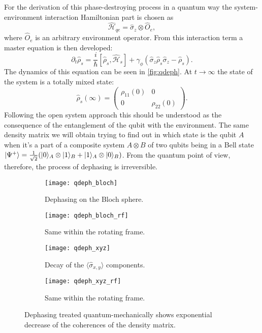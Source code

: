 \documentclass[12pt, twoside]{report}
\DeclarePairedDelimiter\ket{\lvert}{\rangle}
\newcommand{\rbrkt}[1]{\left( #1 \right)}
\numberwithin{equation}{section}
\begin{document}
For the derivation of this phase-destroying process in a quantum way the system-environment interaction Hamiltonian part is chosen as
\[
\mathcal{\hat H}_{qe} = \hat \sigma_z \otimes \hat O_e, 
\]
where $\hat O_e$ is an arbitrary environment operator. From this interaction term a master equation is then developed:
\[
\partial_t \hat \rho_s = \frac{i}{\hbar}[\hat \rho_s, \mathcal{\hat H}_s] + \gamma_\phi (\hat \sigma_z \hat \rho_s \hat \sigma_z - \hat \rho_s).
\]
The dynamics of this equation can be seen in \autoref{fig:qdeph}.  At $t \rightarrow \infty$ the state of the system is a totally mixed state:
\[
\hat \rho_s (\infty) = \rbrkt{\begin{matrix}
\rho_{11}(0) & 0 \\
0 & \rho_{22}(0) 
\end{matrix}}.
\]
Following the open system approach this should be understood as the consequence of the entanglement of the qubit with the environment. The same density matrix we will obtain trying to find out in which state
is the qubit $A$ when it's a part of a composite system $A \otimes B$ of two qubits being in a Bell  state $\ket{\Psi^+} = \frac{1}{\sqrt{2}}(\ket{0}_A\otimes\ket{1}_B+\ket{1}_A\otimes\ket{0}_B)$. From the quantum point of view, therefore, the process of dephasing is irreversible.
\begin{figure}
\centering
\begin{subfigure}[t]{0.45\textwidth}
\centering
\texttt{[image: qdeph\_bloch]}
\caption{Dephasing on the Bloch sphere.}
\end{subfigure}
\begin{subfigure}[t]{0.45\textwidth}
\centering
\texttt{[image: qdeph\_bloch\_rf]}
\caption{Same within the rotating frame.}
\end{subfigure}

\begin{subfigure}[t]{0.45\textwidth}
\centering
\texttt{[image: qdeph\_xyz]}
\caption{Decay of the $\langle \hat \sigma_{x, y} \rangle$ components.}
\end{subfigure}
\begin{subfigure}[t]{0.45\textwidth}
\centering
\texttt{[image: qdeph\_xyz\_rf]}
\caption{Same within the rotating frame.}
\end{subfigure}
\caption{Dephasing treated quantum-mechanically shows exponential decrease of the coherences of the density matrix.}
\label{fig:qdeph}
\end{figure}
\end{document}
